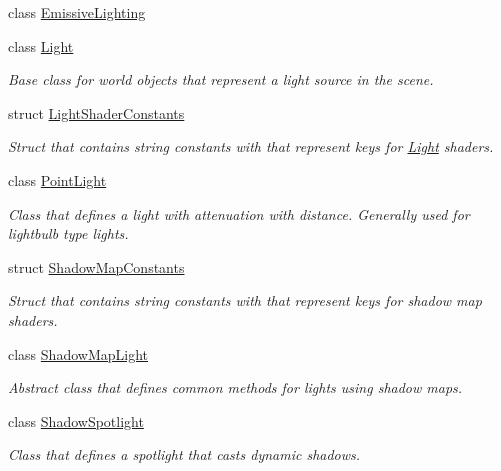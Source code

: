 \begin{DoxyCompactItemize}
class \mbox{\hyperlink{class_geometry_engine_1_1_geometry_world_item_1_1_geometry_light_1_1_emissive_lighting}{Emissive\+Lighting}}
\item 
class \mbox{\hyperlink{class_geometry_engine_1_1_geometry_world_item_1_1_geometry_light_1_1_light}{Light}}
\begin{DoxyCompactList}\small\item\em Base class for world objects that represent a light source in the scene. \end{DoxyCompactList}\item 
struct \mbox{\hyperlink{struct_geometry_engine_1_1_geometry_world_item_1_1_geometry_light_1_1_light_shader_constants}{Light\+Shader\+Constants}}
\begin{DoxyCompactList}\small\item\em Struct that contains string constants with that represent keys for \mbox{\hyperlink{class_geometry_engine_1_1_geometry_world_item_1_1_geometry_light_1_1_light}{Light}} shaders. \end{DoxyCompactList}\item 
class \mbox{\hyperlink{class_geometry_engine_1_1_geometry_world_item_1_1_geometry_light_1_1_point_light}{Point\+Light}}
\begin{DoxyCompactList}\small\item\em Class that defines a light with attenuation with distance. Generally used for lightbulb type lights. \end{DoxyCompactList}\item 
struct \mbox{\hyperlink{struct_geometry_engine_1_1_geometry_world_item_1_1_geometry_light_1_1_shadow_map_constants}{Shadow\+Map\+Constants}}
\begin{DoxyCompactList}\small\item\em Struct that contains string constants with that represent keys for shadow map shaders. \end{DoxyCompactList}\item 
class \mbox{\hyperlink{class_geometry_engine_1_1_geometry_world_item_1_1_geometry_light_1_1_shadow_map_light}{Shadow\+Map\+Light}}
\begin{DoxyCompactList}\small\item\em Abstract class that defines common methods for lights using shadow maps. \end{DoxyCompactList}\item 
class \mbox{\hyperlink{class_geometry_engine_1_1_geometry_world_item_1_1_geometry_light_1_1_shadow_spotlight}{Shadow\+Spotlight}}
\begin{DoxyCompactList}\small\item\em Class that defines a spotlight that casts dynamic shadows. \end{DoxyCompactList}\item 

\end{DoxyCompactItemize}
